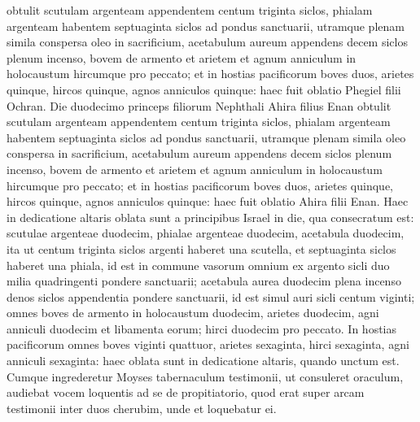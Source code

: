 \begin{biblechapter}
\begin{biblechapter}
\begin{biblechapter}
\begin{biblechapter}
\begin{biblechapter}
\begin{biblechapter}
\begin{biblechapter}
\verse obtulit scutulam argenteam appendentem centum triginta siclos, phialam argenteam habentem septuaginta siclos ad pondus sanctuarii, utramque plenam simila conspersa oleo in sacrificium, 
\verse acetabulum aureum appendens decem siclos plenum incenso, 
\verse bovem de armento et arietem et agnum anniculum in holocaustum 
\verse hircumque pro peccato; 
\verse et in hostias pacificorum boves duos, arietes quinque, hircos quinque, agnos anniculos quinque: haec fuit oblatio Phegiel filii Ochran.
 \verse Die duodecimo princeps filiorum Nephthali Ahira filius Enan 
\verse obtulit scutulam argenteam appendentem centum triginta siclos, phialam argenteam habentem septuaginta siclos ad pondus sanctuarii, utramque plenam simila oleo conspersa in sacrificium, 
\verse acetabulum aureum appendens decem siclos plenum incenso, 
\verse bovem de armento et arietem et agnum anniculum in holocaustum 
 \verse hircumque pro peccato; 
\verse et in hostias pacificorum boves duos, arietes quinque, hircos quinque, agnos anniculos quinque: haec fuit oblatio Ahira filii Enan.
 \verse Haec in dedicatione altaris oblata sunt a principibus Israel in die, qua consecratum est: scutulae argenteae duodecim, phialae argenteae duodecim, acetabula duodecim, 
\verse ita ut centum triginta siclos argenti haberet una scutella, et septuaginta siclos haberet una phiala, id est in commune vasorum omnium ex argento sicli duo milia quadringenti pondere sanctuarii; 
\verse acetabula aurea duodecim plena incenso denos siclos appendentia pondere sanctuarii, id est simul auri sicli centum viginti; 
\verse omnes boves de armento in holocaustum duodecim, arietes duodecim, agni anniculi duodecim et libamenta eorum; hirci duodecim pro peccato. 
\verse In hostias pacificorum omnes boves viginti quattuor, arietes sexaginta, hirci sexaginta, agni anniculi sexaginta: haec oblata sunt in dedicatione altaris, quando unctum est.
 \verse Cumque ingrederetur Moyses tabernaculum testimonii, ut consuleret oraculum, audiebat vocem loquentis ad se de propitiatorio, quod erat super arcam testimonii inter duos cherubim, unde et loquebatur ei.
 

\end{biblechapter}
\end{biblechapter}
\end{biblechapter}
\end{biblechapter}
\end{biblechapter}
\end{biblechapter}
\end{biblechapter}
